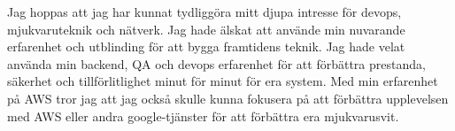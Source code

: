 \documentclass[../../main.tex]{subfiles}
\begin{document}
Jag hoppas att jag har kunnat tydliggöra mitt djupa intresse för devops, mjukvaruteknik och nätverk. Jag hade älskat att använde min nuvarande erfarenhet och utblinding för att bygga framtidens teknik. Jag hade velat använda min backend, QA och devops erfarenhet för att förbättra prestanda, säkerhet och tillförlitlighet minut för minut för era system. Med min erfarenhet på AWS tror jag att jag också skulle kunna fokusera på att förbättra upplevelsen med AWS eller andra google-tjänster för att förbättra era mjukvarusvit.
\\
\end{document}
